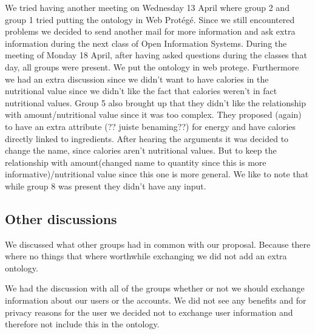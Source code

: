 \newline
\newline
\noindent
We tried having another meeting on Wednesday 13 April where group 2 and group 1 tried putting the ontology in Web Protégé. Since we still encountered problems we decided to send another mail for more information and ask extra information during the next class of Open Information Systems. 
\newline
\newline
\noindent
During the meeting of Monday 18 April, after having asked questions during the classes that day, all groups were present. We put the ontology in web protege. Furthermore we had an extra discussion since we didn't want to have calories in the nutritional value since we didn't like the fact that calories weren't in fact nutritional values. Group 5 also brought up that they didn't like the relationship with amount/nutritional value since it was too complex. They proposed (again) to have an extra attribute (?? juiste benaming??) for energy and have calories directly linked to ingredients. After hearing the arguments it was decided to change the name, since calories aren't nutritional values. But to keep the relationship with amount(changed name to quantity since this is more informative)/nutritional value since this one is more general. We like to note that while group 8 was present they didn't have any input. 

\subsection{Other discussions}
We discussed what other groups had in common with our proposal. Because there where no things that where worthwhile exchanging we did not add an extra ontology.

We had the discussion with all of the groups whether or not we should exchange information about our users or the accounts. We did not see any benefits and for privacy reasons for the user we decided not to exchange user information and therefore not include this in the ontology.  
